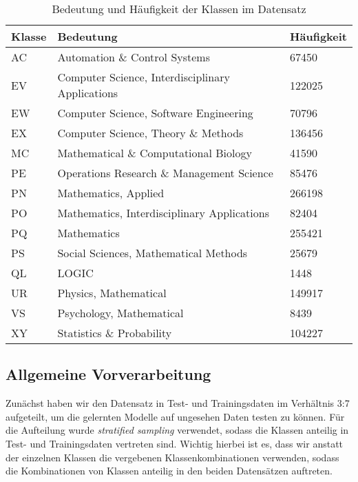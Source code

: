 \begin{table}[h]
    \centering
    \begin{tabular}{l|l|l}
        \textbf{Klasse} & \textbf{Bedeutung} & \textbf{Häufigkeit}\\
        \hline
        AC & Automation \& Control Systems & 67450\\
        EV & Computer Science, Interdisciplinary Applications & 122025\\
        EW & Computer Science, Software Engineering & 70796\\
        EX & Computer Science, Theory \& Methods & 136456\\
        MC & Mathematical \& Computational Biology & 41590\\
        PE & Operations Research \& Management Science & 85476\\
        PN & Mathematics, Applied & 266198\\
        PO & Mathematics, Interdisciplinary Applications & 82404\\
        PQ & Mathematics & 255421\\
        PS & Social Sciences, Mathematical Methods & 25679\\
        QL & LOGIC & 1448\\
        UR & Physics, Mathematical & 149917\\
        VS & Psychology, Mathematical & 8439\\
        XY & Statistics \& Probability & 104227\\
    \end{tabular}
    \caption{Bedeutung und Häufigkeit der Klassen im Datensatz}
    \label{tab:class_meaning}
\end{table}


\subsection{Allgemeine Vorverarbeitung}

Zunächst haben wir den Datensatz in Test- und Trainingsdaten im Verhältnis 3:7 aufgeteilt, um die gelernten Modelle auf ungesehen Daten testen zu können.
Für die Aufteilung wurde \emph{stratified sampling} verwendet, sodass die Klassen anteilig in Test- und Trainingsdaten vertreten sind.
Wichtig hierbei ist es, dass wir anstatt der einzelnen Klassen die vergebenen Klassenkombinationen verwenden, sodass die Kombinationen von Klassen anteilig in den beiden Datensätzen auftreten.




